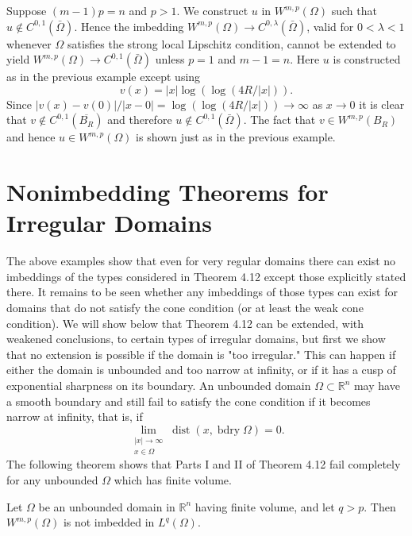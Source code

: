 \begin{example}
  Suppose $(m-1) p=n$ and $p>1$. We construct $u$ in $W^{m, p}(\Omega)$ such that $u \notin C^{0,1}(\bar{\Omega})$. Hence the imbedding $W^{m, p}(\Omega) \rightarrow C^{0, \lambda}(\bar{\Omega})$, valid for $0<\lambda<1$ whenever $\Omega$ satisfies the strong local Lipschitz condition,
  cannot be extended to yield $W^{m, p}(\Omega) \rightarrow C^{0,1}(\bar{\Omega})$ unless $p=1$ and $m-1=n$. Here $u$ is constructed as in the previous example except using
  \[
  v(x)=|x| \log (\log (4 R /|x|)) .
  \]
  Since $|v(x)-v(0)| /|x-0|=\log (\log (4 R /|x|)) \rightarrow \infty$ as $x \rightarrow 0$ it is clear that $v \notin C^{0,1}\left(\overline{B_R}\right)$ and therefore $u \notin C^{0,1}(\bar{\Omega})$. The fact that $v \in W^{m, p}\left(B_R\right)$ and hence $u \in W^{m, p}(\Omega)$ is shown just as in the previous example.
\end{example}


\section{Nonimbedding Theorems for Irregular Domains}

\begin{para}
  The above examples show that even for very regular domains there can exist no imbeddings of the types considered in Theorem 4.12 except those explicitly stated there. It remains to be seen whether any imbeddings of those types can exist for domains that do not satisfy the cone condition (or at least the weak cone condition). We will show below that Theorem 4.12 can be extended, with weakened conclusions, to certain types of irregular domains, but first we show that no extension is possible if the domain is "too irregular." This can happen if either the domain is unbounded and too narrow at infinity, or if it has a cusp of exponential sharpness on its boundary.
  An unbounded domain $\Omega \subset \mathbb{R}^n$ may have a smooth boundary and still fail to satisfy the cone condition if it becomes narrow at infinity, that is, if
  \[
  \lim _{\substack{|x| \rightarrow \infty \\ x \in \Omega}} \operatorname{dist}(x, \operatorname{bdry} \Omega)=0 .
  \]
  The following theorem shows that Parts I and II of Theorem 4.12 fail completely for any unbounded $\Omega$ which has finite volume.
\end{para}


\begin{theorem}
  Let $\Omega$ be an unbounded domain in $\mathbb{R}^n$ having finite volume, and let $q>p$. Then $W^{m, p}(\Omega)$ is not imbedded in $L^q(\Omega)$.
\end{theorem}


